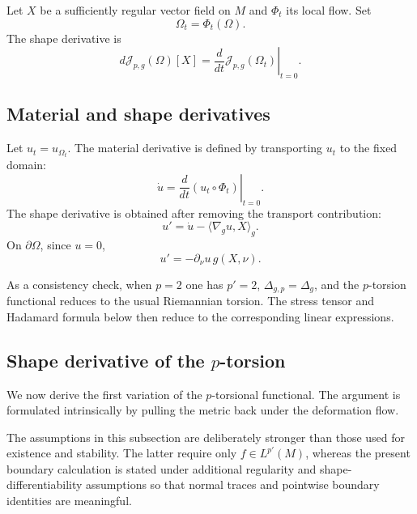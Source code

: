 \documentclass{article}
\begin{document}
Let $X$ be a sufficiently regular vector field on $M$ and
$\Phi_t$ its local flow. Set
\[
\Omega_t=\Phi_t(\Omega).
\]
The shape derivative is
\[
d\mathcal J_{p,g}(\Omega)[X]
=
\left.\frac d{dt}
\mathcal J_{p,g}(\Omega_t)\right|_{t=0}.
\]

\subsection{Material and shape derivatives}

Let $u_t=u_{\Omega_t}$. The material derivative is defined by
transporting $u_t$ to the fixed domain:
\[
\dot u
=
\left.\frac d{dt}
(u_t\circ\Phi_t)\right|_{t=0}.
\]
The shape derivative is obtained after removing the transport
contribution:
\[
u'
=
\dot u-\langle\nabla_g u,X\rangle_g.
\]
On $\partial\Omega$, since $u=0$,
\[
u'
=
-\partial_\nu u\,g(X,\nu).
\]

As a consistency check, when $p=2$ one has $p'=2$, $\Delta_{g,p}=\Delta_g$, and the $p$-torsion functional reduces to the usual Riemannian torsion. The stress tensor and Hadamard formula below then reduce to the corresponding linear expressions.

\subsection{Shape derivative of the $p$-torsion}

We now derive the first variation of the $p$-torsional functional.
The argument is formulated intrinsically by pulling the metric back
under the deformation flow.

The assumptions in this subsection are deliberately stronger than those used for existence and stability. The latter require only $f\in L^{p'}(M)$, whereas the present boundary calculation is stated under additional regularity and shape-differentiability assumptions so that normal traces and pointwise boundary identities are meaningful.
\end{document}
